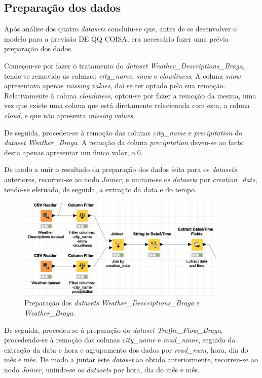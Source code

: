 \documentclass[a4paper, 12pt]{article}
\begin{document}
\subsection{Preparação dos dados}

Após análise dos quatro \textit{datasets} concluiu-se que, antes de se desenvolver o modelo para a previsão DE QQ COISA, era necessário fazer uma prévia preparação dos dados.

Começou-se por fazer o tratamento do \textit{dataset Weather\_Descriptions\_Braga}, tendo-se removido as colunas: \textit{city\_name}, \textit{snow} e \textit{cloudiness}. A coluna \textit{snow} apresentava apenas \textit{missing values}, daí se ter optado pela sua remoção. Relativamente à  coluna \textit{cloudiness}, optou-se por fazer a remoção da mesma, uma vez que existe uma coluna que está diretamente relacionada com esta, a coluna \textit{cloud}, e que não apresenta \textit{missing values}.

De seguida, procedeu-se à remoção das colunas \textit{city\_name} e \textit{precipitation} do \textit{dataset Weather\_Braga}. A remoção da coluna \textit{precipitation} deveu-se ao facto desta apenas apresentar um único valor, o $0$. 

De modo a unir o resultado da preparação dos dados feita para os \textit{datasets} anteriores, recorreu-se ao nodo \textit{Joiner}, e uniram-se os \textit{datasets} por \textit{creation\_date}, tendo-se efetuado, de seguida, a extração da data e do tempo.

\begin{figure}[H]
	\centering
	\includegraphics[width=10cm]{weather}
	\caption{Preparação dos \textit{datasets Weather\_Descriptions\_Braga} e \textit{Weather\_Braga}.}
\end{figure}

De seguida, procedeu-se à preparação do \textit{dataset Traffic\_Flow\_Braga}, procedendo-se à remoção das colunas \textit{city\_name} e \textit{road\_name}, seguida da extração da data e hora e agrupamento dos dados por \textit{road\_num}, hora, dia do mês e mês. De modo a juntar este \textit{dataset} ao obtido anteriormente, recorreu-se ao nodo \textit{Joiner}, unindo-se os \textit{datasets} por hora, dia do mês e mês.
\end{document}
